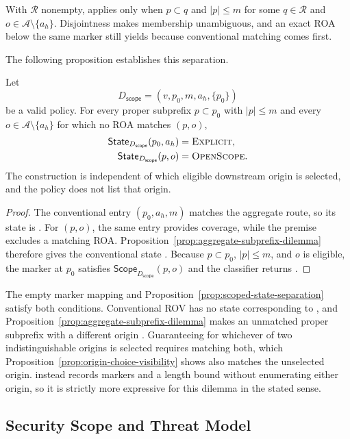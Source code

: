 With $\mathcal{R}$ nonempty, \openscope{} applies only when $p\subset q$ and $|p|\leq m$ for some $q\in\mathcal{R}$ and $o\in\mathcal{A}\setminus\{a_h\}$. Disjointness makes membership unambiguous, and an exact ROA below the same marker still yields \explicit{} because conventional matching comes first.

The following proposition establishes this separation.

\begin{proposition}
\label{prop:scoped-state-separation}
Let
\[
D_{\mathsf{scope}}=(v,p_0,m,a_h,\{p_0\})
\]
be a valid policy. For every proper subprefix $p\subset p_0$ with $|p|\leq m$ and every $o\in\mathcal{A}\setminus\{a_h\}$ for which no ROA matches $(p,o)$,
\[
\begin{aligned}
\mathsf{State}_{D_{\mathsf{scope}}}(p_0,a_h)&=\textnormal{\textsc{Explicit}},\\
\mathsf{State}_{D_{\mathsf{scope}}}(p,o)&=\mbox{\textnormal{\textsc{OpenScope}}}.
\end{aligned}
\]
The construction is independent of which eligible downstream origin is selected, and the policy does not list that origin.
\end{proposition}

\begin{proof}
The conventional entry $(p_0,a_h,m)$ matches the aggregate route, so its state is \explicit{}. For $(p,o)$, the same entry provides coverage, while the premise excludes a matching ROA. Proposition~\ref{prop:aggregate-subprefix-dilemma} therefore gives the conventional state \invalid{}. Because $p\subset p_0$, $|p|\leq m$, and $o$ is eligible, the marker at $p_0$ satisfies $\mathsf{Scope}_{D_{\mathsf{scope}}}(p,o)$ and the classifier returns \openscope{}.
\end{proof}

The empty marker mapping and Proposition~\ref{prop:scoped-state-separation} satisfy both conditions. Conventional ROV has no state corresponding to \openscope{}, and Proposition~\ref{prop:aggregate-subprefix-dilemma} makes an unmatched proper subprefix with a different origin \invalid{}. Guaranteeing \valid{} for whichever of two indistinguishable origins is selected requires matching both, which Proposition~\ref{prop:origin-choice-visibility} shows also matches the unselected origin. \ssrov{} instead records markers and a length bound without enumerating either origin, so it is strictly more expressive for this dilemma in the stated sense.

\subsection{Security Scope and Threat Model}
\label{sec:security-scope}

